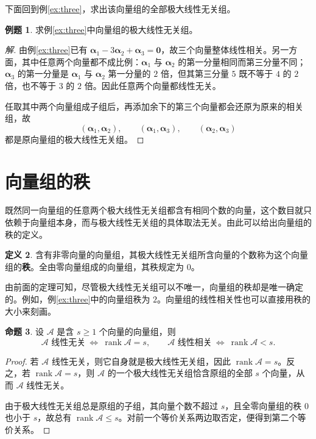 \documentclass[UTF8, fontset=fandol, a4paper, 12pt]{ctexart}
\newcommand{\va}{\boldsymbol\alpha}
\newcommand{\vo}{\boldsymbol0}
\theoremstyle{definition}
\newtheorem{definition}{定义}[section]
\newtheorem{proposition}[definition]{命题}
\newtheorem{example}[definition]{例题}
\begin{document}
下面回到例\ref{ex:three}，求出该向量组的全部极大线性无关组。

\begin{example}
求例\ref{ex:three}中向量组的极大线性无关组。
\end{example}
\begin{proof}[解]
由例\ref{ex:three}已有 $\va_1-3\va_2+\va_3=\vo$，故三个向量整体线性相关。另一方面，其中任意两个向量都不成比例：$\va_1$ 与 $\va_2$ 的第一分量相同而第三分量不同；$\va_3$ 的第一分量是 $\va_1$ 与 $\va_2$ 第一分量的 $2$ 倍，但其第三分量 $5$ 既不等于 $4$ 的 $2$ 倍，也不等于 $3$ 的 $2$ 倍。因此任意两个向量都线性无关。

任取其中两个向量组成子组后，再添加余下的第三个向量都会还原为原来的相关组，故
\[
 (\va_1,\va_2),\qquad(\va_1,\va_3),\qquad(\va_2,\va_3)
\]
都是原向量组的极大线性无关组。
\end{proof}

\section{向量组的秩}

既然同一向量组的任意两个极大线性无关组都含有相同个数的向量，这个数目就只依赖于向量组本身，而与极大线性无关组的具体取法无关。由此可以给出向量组的秩的定义。

\begin{definition}
含有非零向量的向量组，其极大线性无关组所含向量的个数称为这个向量组的\textbf{秩}。全由零向量组成的向量组，其秩规定为 $0$。
\end{definition}

由前面的定理可知，尽管极大线性无关组可以不唯一，向量组的秩却是唯一确定的。例如，例\ref{ex:three}中的向量组秩为 $2$。向量组的线性相关性也可以直接用秩的大小来刻画。

\begin{proposition}
设 $\mathcal A$ 是含 $s\ge1$ 个向量的向量组，则
\[
 \mathcal A\text{ 线性无关}\ \Longleftrightarrow\ \operatorname{rank}\mathcal A=s,
 \qquad
 \mathcal A\text{ 线性相关}\ \Longleftrightarrow\ \operatorname{rank}\mathcal A<s.
\]
\end{proposition}
\begin{proof}
若 $\mathcal A$ 线性无关，则它自身就是极大线性无关组，因此 $\operatorname{rank}\mathcal A=s$。反之，若 $\operatorname{rank}\mathcal A=s$，则 $\mathcal A$ 的一个极大线性无关组恰含原组的全部 $s$ 个向量，从而 $\mathcal A$ 线性无关。

由于极大线性无关组总是原组的子组，其向量个数不超过 $s$，且全零向量组的秩 $0$ 也小于 $s$，故总有 $\operatorname{rank}\mathcal A\le s$。对前一个等价关系两边取否定，便得到第二个等价关系。
\end{proof}
\end{document}
